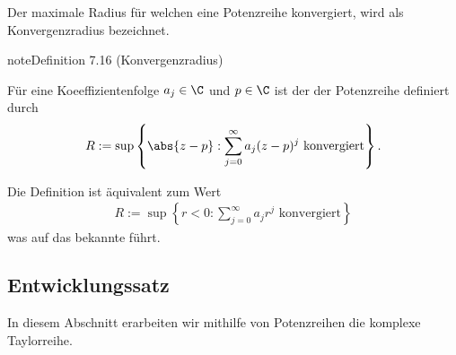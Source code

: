 \documentclass[letterpaper,10pt,german]{jupyterBook}
\begin{document}
\sphinxAtStartPar
Der maximale Radius für welchen eine Potenzreihe konvergiert, wird als Konvergenzradius bezeichnet.
\label{complexanalysis/powerseries:definition-4}
\begin{sphinxadmonition}{note}{Definition 7.16 (Konvergenzradius)}



\sphinxAtStartPar
Für eine Koeeffizientenfolge \(a_j\in\C\) und \(p\in\C\) ist der  der Potenzreihe definiert durch
\begin{equation*}
\begin{split}R :=\sup\left\{\abs{z - p}: \sum_{j=0}^\infty a_j (z-p)^j \text{ konvergiert}\right\}.\end{split}
\end{equation*}\end{sphinxadmonition}

\sphinxAtStartPar
Die Definition ist äquivalent zum Wert
\begin{equation*}
\begin{split}R :=\sup\left\{r<0: \sum_{j=0}^\infty a_j r^j\text{ konvergiert} \right\}\end{split}
\end{equation*}
\sphinxAtStartPar
was auf das bekannte  führt.


\subsection{Entwicklungssatz}
\label{\detokenize{complexanalysis/powerseries:entwicklungssatz}}
\sphinxAtStartPar
In diesem Abschnitt erarbeiten wir mithilfe von Potenzreihen die komplexe Taylorreihe.
\end{document}
